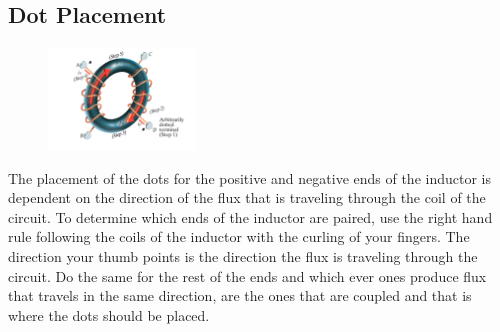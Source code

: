 \documentclass[12pt]{article}
\begin{document}
    \subsection*{Dot Placement}
    \begin{figure}[h]
        \centering
        \includegraphics[width=0.35\textwidth]{Dot Selection.png}
    \end{figure}
    \par The placement of the dots for the positive and negative ends of the
    inductor is dependent on the direction of the flux that is traveling through
    the coil of the circuit. To determine which ends of the inductor are paired,
    use the right hand rule following the coils of the inductor with the curling
    of your fingers. The direction your thumb points is the direction the flux
    is traveling through the circuit. Do the same for the rest of the ends and
    which ever ones produce flux that travels in the same direction, are the
    ones that are coupled and that is where the dots should be placed.
\end{document}
